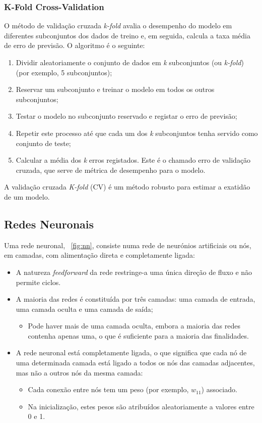 \documentclass[conference]{IEEEtran}
\begin{document}
\medskip
\subsubsection{K-Fold Cross-Validation}

O método de validação cruzada \textit{k-fold} avalia o desempenho do modelo em diferentes subconjuntos dos dados de treino e, em seguida, calcula a taxa média de erro de previsão. O algoritmo é o seguinte:
\begin{enumerate}
	\item Dividir aleatoriamente o conjunto de dados em \textit{k} subconjuntos (ou \textit{k-fold}) (por exemplo, 5 subconjuntos);
	\item Reservar um subconjunto e treinar o modelo em todos os outros subconjuntos;
	\item Testar o modelo no subconjunto reservado e registar o erro de previsão;
	\item Repetir este processo até que cada um dos \textit{k} subconjuntos tenha servido como conjunto de teste; 
	\item Calcular a média dos \textit{k} erros registados. Este é o chamado erro de validação cruzada, que serve de métrica de desempenho para o modelo. 
\end{enumerate}

A validação cruzada \textit{K-fold} (CV) é um método robusto para estimar a exatidão de um modelo. \cite{madureira2024cv}

\subsection{Redes Neuronais}

Uma rede neuronal, \figurename~\ref{fig:nn}, consiste numa rede de neurónios artificiais ou nós, em camadas, com alimentação direta e completamente ligada:

\begin{itemize}
	\item A natureza \textit{feedforward} da rede restringe-a uma única direção de fluxo e não permite ciclos. 
	\item A maioria das redes é constituída por três camadas: uma camada de entrada, uma camada oculta e uma camada de saída; 
	\begin{itemize}
		\item Pode haver mais de uma camada oculta, embora a maioria das redes contenha apenas uma, o que é suficiente para a maioria das finalidades.
	\end{itemize}
	
	  
	\item  A rede neuronal está completamente ligada, o que significa que cada nó de uma determinada camada está ligado a todos os nós das camadas adjacentes, mas não a outros nós da mesma camada:
	\begin{itemize}
		\item Cada conexão entre nós tem um peso (por exemplo, $w_{11}$) associado.
		\item  Na inicialização, estes pesos são atribuídos aleatoriamente a valores entre 0 e 1. \cite{madureira2024nn}
	\end{itemize}
\end{itemize}
\end{document}
